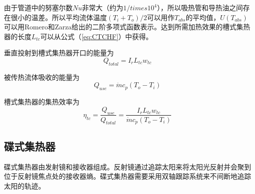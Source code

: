 由于管道中的努塞尔数$Nu$非常大（约为$1/times10^4$），所以吸热管和导热油之间存在很小的温差。所以平均流体温度$(T_{i}+T_{o})/2$可以用作$T_{abs}$的平均值，$U(T_{abs})$可以用Romero和Zarza给出的二阶多项式函数表示\cite{Romero2007}。达到所需加热效果的槽式集热器的长度$L_{tc}$可以从公式（\ref{eq:CTCHF}）中获得。

垂直投射到槽式集热器开口的能量为
\begin{equation}
  Q_{total} = I_r L_{tc} w_{tc}
\end{equation}

被传热流体吸收的能量为
\begin{equation}
  Q_{use} = \dot{m}c_p(T_o - T_i)
\end{equation}

槽式集热器的集热效率为
\begin{equation}
  \eta_{tc} = \dfrac{Q_{use}}{Q_{total}} = 
  \dfrac{I_r L_{tc} w_{tc}}{\dot{m}c_p(T_o - T_i)}
  \label{eq:eta_tc}
\end{equation}

\subsection{碟式集热器}
\label{sec:pdc}

碟式集热器由发射镜和接收器组成。反射镜通过追踪太阳来将太阳光反射并会聚到位于反射镜焦点处的接收器熵。碟式集热器需要采用双轴跟踪系统来不间断地追踪太阳的轨迹。

